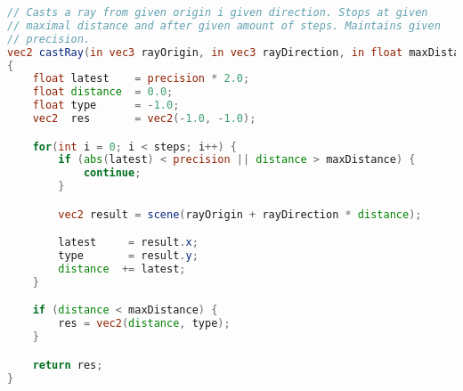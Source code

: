 \begin{minipage}{\linewidth}
\begin{lstlisting}[language=GLSL,caption={Umsetzung des Sphere Tracings in
        GLSL.},label={alg:glsl_sphere_tracing},captionpos=b,emph={castRay}]
// Casts a ray from given origin i given direction. Stops at given
// maximal distance and after given amount of steps. Maintains given
// precision.
vec2 castRay(in vec3 rayOrigin, in vec3 rayDirection, in float maxDistance, in float precision, in int steps)
{
    float latest    = precision * 2.0;
    float distance  = 0.0;
    float type      = -1.0;
    vec2  res       = vec2(-1.0, -1.0);

    for(int i = 0; i < steps; i++) {
        if (abs(latest) < precision || distance > maxDistance) {
            continue;
        }

        vec2 result = scene(rayOrigin + rayDirection * distance);

        latest     = result.x;
        type       = result.y;
        distance  += latest;
    }

    if (distance < maxDistance) {
        res = vec2(distance, type);
    }

    return res;
}
\end{lstlisting}
\end{minipage}

